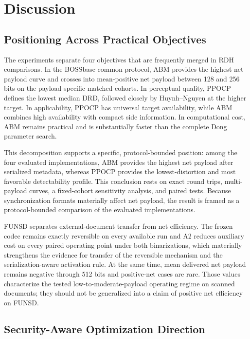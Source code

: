 \section{Discussion}
\label{sec:discussion}

\subsection{Positioning Across Practical Objectives}

\RevisionAddBegin
The experiments separate four objectives that are frequently merged in RDH
comparisons. In the BOSSbase common protocol, ABM provides the highest
net-payload curve and crosses into mean-positive net payload between 128 and
256 bits on the payload-specific matched cohorts. In perceptual quality, PPOCP
defines the lowest median DRD, followed closely by Huynh--Nguyen at the higher
target. In applicability, PPOCP has universal target availability, while ABM
combines high availability with compact side information. In computational
cost, ABM remains practical and is substantially faster than the complete Dong
parameter search.
\RevisionAddEnd

This decomposition supports a specific, protocol-bounded position: among the
four evaluated implementations, ABM provides the highest net payload after
serialized metadata, whereas PPOCP provides the lowest-distortion and
\RevisionAddBegin
most favorable detectability profile. This conclusion rests on exact round trips,
\RevisionAddEnd
multi-payload curves, a fixed-cohort sensitivity analysis, and paired tests.
Because synchronization formats materially affect net payload, the result is
\RevisionAddBegin
framed as a protocol-bounded comparison of the evaluated implementations.
\RevisionAddEnd

\RevisionAddBegin
FUNSD separates external-document transfer from net efficiency. The frozen
codec remains exactly reversible on every available run and A2 reduces
auxiliary cost on every paired operating point under both binarizations, which
materially strengthens the evidence for transfer of the reversible mechanism
and the serialization-aware activation rule. At the same time, mean delivered
net payload remains negative through 512 bits and positive-net cases are rare.
Those values characterize the tested low-to-moderate-payload operating regime
on scanned documents; they should not be generalized into a claim of positive
net efficiency on FUNSD.
\RevisionAddEnd

\subsection{Security-Aware Optimization Direction}

